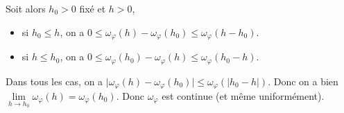 \begin{solution}
\begin{enumerate}
		Soit alors $h_{0}>0$ fixé et $h>0$,
		\begin{itemize}
			\item si $h_{0}\leqslant h$, on a $0\leqslant\omega_\varphi(h)-\omega_\varphi(h_0)\leqslant\omega_\varphi(h-h_0)$.
			\item si $h\leqslant h_{0}$, on a $0\leqslant\omega_\varphi(h_0)-\omega_\varphi(h)\leqslant\omega_\varphi(h_0-h)$.
		\end{itemize}
		Dans tous les cas, on a $\vert\omega_\varphi(h)-\omega_\varphi(h_{0})\vert\leqslant\omega_\varphi(\vert h_{0}-h\vert)$. Donc on a bien $\lim\limits_{h\to h_{0}}\omega_\varphi(h)=\omega_\varphi(h_{0})$. Donc $\omega_{\varphi}$ est continue (et même uniformément).
	\end{enumerate}
\end{solution}

